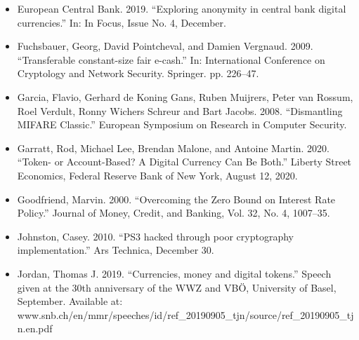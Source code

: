 \documentclass[10pt,spanish]{article}
\begin{document}
\begin{itemize}
\item European Central Bank. 2019. ``Exploring anonymity in central bank
digital currencies.'' In: In Focus, Issue No. 4, December.
\end{itemize}

\begin{itemize}
\item Fuchsbauer, Georg, David Pointcheval, and Damien Vergnaud. 2009.
``Transferable constant-size fair e-cash.'' In: International Conference
on Cryptology and Network Security. Springer. pp. 226--47.
\end{itemize}

\begin{itemize}
\item Garcia, Flavio, Gerhard de Koning Gans, Ruben Muijrers, Peter van
Rossum, Roel Verdult, Ronny Wichers Schreur and Bart Jacobs. 2008.
``Dismantling MIFARE Classic.'' European Symposium on Research in
Computer Security.
\end{itemize}

\begin{itemize}
\item Garratt, Rod, Michael Lee, Brendan Malone, and Antoine Martin. 2020.
``Token- or Account-Based? A Digital Currency Can Be Both.'' Liberty
Street Economics, Federal Reserve Bank of New York, August 12, 2020.
\end{itemize}

\begin{itemize}
\item Goodfriend, Marvin. 2000. ``Overcoming the Zero Bound on Interest Rate
Policy.'' Journal of Money, Credit, and Banking, Vol. 32, No. 4,
1007--35.
\end{itemize}

\begin{itemize}
\item Johnston, Casey. 2010. ``PS3 hacked through poor cryptography
implementation.'' Ars Technica, December 30.
\end{itemize}

\begin{itemize}
\item Jordan, Thomas J. 2019. ``Currencies, money and digital tokens.'' Speech
given at the 30th anniversary of the WWZ and VBÖ, University of Basel,
September. Available at:
www.snb.ch/en/mmr/speeches/id/ref\_20190905\_tjn/source/ref\_20190905\_tjn.en.pdf
\end{itemize}
\end{document}
